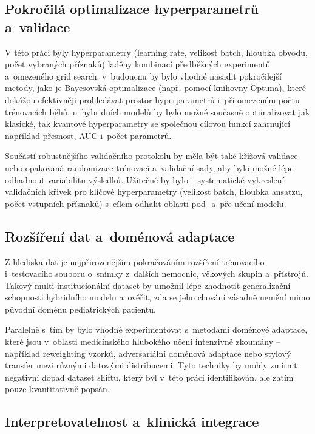 \documentclass[12pt, a4paper]{report}
\begin{document}
\subsection{Pokročilá optimalizace hyperparametrů a~validace}

V této práci byly hyperparametry (learning rate, velikost batch, hloubka obvodu, počet vybraných příznaků) laděny kombinací předběžných experimentů a~omezeného grid search. v~budoucnu by bylo vhodné nasadit pokročilejší metody, jako je Bayesovská optimalizace (např. pomocí knihovny Optuna), které dokážou efektivněji prohledávat prostor hyperparametrů i~při omezeném počtu trénovacích běhů. u~hybridních modelů by bylo možné současně optimalizovat jak klasické, tak kvantové hyperparametry se společnou cílovou funkcí zahrnující například přesnost, AUC i~počet parametrů.

Součástí robustnějšího validačního protokolu by měla být také křížová validace nebo opakovaná randomizace trénovací a~validační sady, aby bylo možné lépe odhadnout variabilitu výsledků. Užitečné by bylo i~systematické vykreslení validačních křivek pro klíčové hyperparametry (velikost batch, hloubka ansatzu, počet vstupních příznaků) s~cílem odhalit oblasti pod- a~pře-učení modelu.

\subsection{Rozšíření dat a~doménová adaptace}

Z hlediska dat je nejpřirozenějším pokračováním rozšíření trénovacího i~testovacího souboru o~snímky z~dalších nemocnic, věkových skupin a~přístrojů. Takový multi-institucionální dataset by umožnil lépe zhodnotit generalizační schopnosti hybridního modelu a~ověřit, zda se jeho chování zásadně nemění mimo původní doménu pediatrických pacientů.

Paralelně s~tím by bylo vhodné experimentovat s~metodami doménové adaptace, které jsou v~oblasti medicínského hlubokého učení intenzivně zkoumány – například reweighting vzorků, adversariální doménová adaptace nebo stylový transfer mezi různými datovými distribucemi. Tyto techniky by mohly zmírnit negativní dopad dataset shiftu, který byl v~této práci identifikován, ale zatím pouze kvantitativně popsán.

\subsection{Interpretovatelnost a~klinická integrace}
\end{document}

